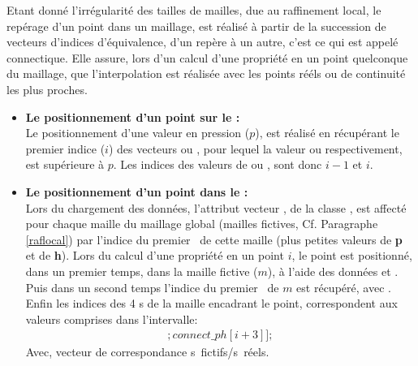    Etant donné l'irrégularité des tailles de mailles, due au raffinement local, le repérage d'un point dans un maillage, est réalisé à partir
   de la succession de vecteurs d'indices d'équivalence,
   d'un repère à un autre, c'est ce qui est appelé connectique. Elle assure, lors d'un calcul d'une propriété en un point quelconque du maillage, 
   que l'interpolation est réalisée avec les points rééls ou de continuité les plus proches.
   \vspace{0.3cm}
   \begin{itemize}
     \item[\textbullet] \textbf{Le positionnement d'un point sur le \sgp:}\\
     Le positionnement d'une valeur en pression ($p$), est réalisé en récupérant le premier indice ($i$) des vecteurs
      ou , pour lequel la valeur  ou  respectivement, est supérieure à $p$.
     Les indices des valeurs de  ou , sont donc $i-1$ et $i$.
     \smallbreak\vspace{0.3cm}
     \item[\textbullet] \textbf{Le positionnement d'un point dans le \pph:}\\
      Lors du chargement des données, l'attribut vecteur , de la classe \IPP,
      est affecté pour chaque maille du maillage global (mailles fictives, Cf. Paragraphe \ref{raflocal})
      par l'indice du premier \n\ de cette maille (plus petites valeurs de \textbf{p} et de \textbf{h}).
      \smallbreak\vspace{0.3cm}
      Lors du calcul d'une propriété en un point $i$,
      le point est positionné, dans un premier temps, dans la maille fictive ($m$),
      à l'aide des données  et . 
      Puis dans un second temps l'indice du premier \n\ de $m$ est récupéré, avec .
      Enfin les indices des 4 \n s de la maille encadrant le point, correspondent aux valeurs comprises dans l'intervalle:
      \begin{align*}
      [connect\_ph[i];connect\_ph[i+3]];
      \end{align*}
      Avec,  vecteur de correspondance \n s~fictifs/\n s~réels.
      \smallbreak\vspace{0.3cm}
   
   \end{itemize}
   \vspace{0.5cm}
   
